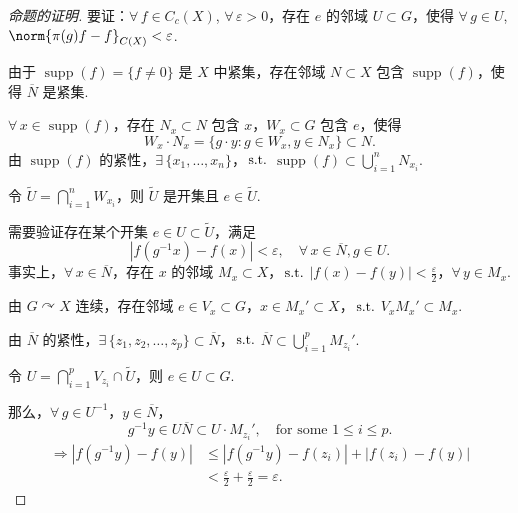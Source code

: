 \begin{proof}[命题的证明]
要证：$\forall\, f \in C_c(X)$, $\forall\, \varepsilon > 0$，存在 $e$ 的邻域 $U \subset G$，使得 $\forall\, g \in U$, $\norm{\pi(g)f - f}_{C(X)} < \varepsilon$.\par
由于 $\operatorname{supp}(f) = \{f \neq 0\}$ 是 $X$ 中紧集，存在邻域 $N \subset X$ 包含 $\operatorname{supp}(f)$，使得 $\overline{N}$ 是紧集.\par
$\forall\, x \in \operatorname{supp}(f)$，存在 $N_x \subset N$ 包含 $x$，$W_x \subset G$ 包含 $e$，使得
\begin{equation*}
W_x \cdot N_x = \{g \cdot y: g \in W_x, y \in N_x\} \subset N.
\end{equation*}
由 $\operatorname{supp}(f)$ 的紧性，$\exists\, \{x_1, \ldots, x_n\}$，$\operatorname{\,\text{s.t.}}$ $\operatorname{supp}(f) \subset \bigcup_{i=1}^n N_{x_i}$.\par
令 $\widetilde{U} = \bigcap_{i=1}^n W_{x_i}$，则 $\widetilde{U}$ 是开集且 $e \in \widetilde{U}$.\par
需要验证存在某个开集 $e \in U \subset \widetilde{U}$，满足
\begin{equation*}
|f(g^{-1}x) - f(x)| < \varepsilon, \quad \forall\, x \in \overline{N}, g \in U.
\end{equation*}
事实上，$\forall\, x \in \overline{N}$，存在 $x$ 的邻域 $M_x \subset X$，$\operatorname{\,\text{s.t.}}$ $|f(x) - f(y)| < \frac{\varepsilon}{2}$，$\forall\, y \in M_x$.\par
由 $G \curvearrowright X$ 连续，存在邻域 $e \in V_x \subset G$，$x \in M_x' \subset X$，$\operatorname{\,\text{s.t.}}$ $V_x M_x' \subset M_x$.\par
由 $\overline{N}$ 的紧性，$\exists\, \{z_1, z_2, \ldots, z_p\} \subset \overline{N}$，$\operatorname{\,\text{s.t.}}$ $\overline{N} \subset \bigcup_{i=1}^p M_{z_i}'$.\par
令 $U = \bigcap_{i=1}^p V_{z_i} \cap \widetilde{U}$，则 $e \in U \subset G$.\par
那么，$\forall\, g \in U^{-1}$，$y \in \overline{N}$，
\begin{equation*}
g^{-1}y \in U\overline{N} \subset U \cdot M_{z_i}', \quad \text{for some } 1 \leq i \leq p.
\end{equation*}
\begin{align*}
\Rightarrow |f(g^{-1}y) - f(y)|
&\leq |f(g^{-1}y) - f(z_i)| + |f(z_i) - f(y)| \\
&< \frac{\varepsilon}{2} + \frac{\varepsilon}{2} = \varepsilon.
\end{align*}
\end{proof}

